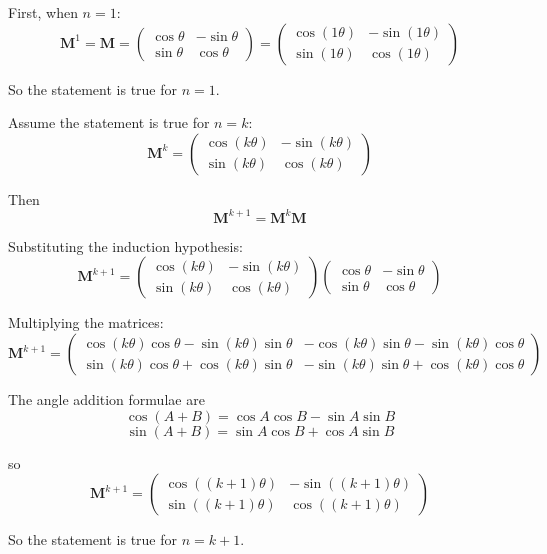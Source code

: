 \documentclass[leqno]{article}
\begin{document}
\begin{enumerate}[
  label=\textbf{\arabic*.},
  leftmargin=*,
  topsep=0pt,
  partopsep=0pt,
  parsep=0pt
]
\begin{djsSolution}
\begin{enumerate}[label=\textbf{(\alph*)}]
  First, when $n=1$:
  \[
  \mathbf{M}^1=\mathbf{M}=
  \begin{pmatrix}
  \cos\theta & -\sin\theta\\
  \sin\theta & \cos\theta
  \end{pmatrix}
  =
  \begin{pmatrix}
  \cos(1\theta) & -\sin(1\theta)\\
  \sin(1\theta) & \cos(1\theta)
  \end{pmatrix}
  \]

  So the statement is true for $n=1$.

  Assume the statement is true for $n=k$:
  \[
  \mathbf{M}^k=
  \begin{pmatrix}
  \cos(k\theta) & -\sin(k\theta)\\
  \sin(k\theta) & \cos(k\theta)
  \end{pmatrix}
  \]

  Then
  \[
  \mathbf{M}^{k+1}=\mathbf{M}^k\mathbf{M}
  \]

  Substituting the induction hypothesis:
  \[
  \mathbf{M}^{k+1}
  =
  \begin{pmatrix}
  \cos(k\theta) & -\sin(k\theta)\\
  \sin(k\theta) & \cos(k\theta)
  \end{pmatrix}
  \begin{pmatrix}
  \cos\theta & -\sin\theta\\
  \sin\theta & \cos\theta
  \end{pmatrix}
  \]

  Multiplying the matrices:
  \[
  \mathbf{M}^{k+1}
  =
  \begin{pmatrix}
  \cos(k\theta)\cos\theta-\sin(k\theta)\sin\theta
  &
  -\cos(k\theta)\sin\theta-\sin(k\theta)\cos\theta
  \\[4pt]
  \sin(k\theta)\cos\theta+\cos(k\theta)\sin\theta
  &
  -\sin(k\theta)\sin\theta+\cos(k\theta)\cos\theta
  \end{pmatrix}
  \]

  The angle addition formulae are
  \[
  \cos(A+B)=\cos A\cos B-\sin A\sin B
  \]
  \[
  \sin(A+B)=\sin A\cos B+\cos A\sin B
  \]

  so
  \[
  \mathbf{M}^{k+1}
  =
  \begin{pmatrix}
  \cos((k+1)\theta) & -\sin((k+1)\theta)\\
  \sin((k+1)\theta) & \cos((k+1)\theta)
  \end{pmatrix}
  \]

  So the statement is true for $n=k+1$.


\end{enumerate}
\end{djsSolution}
\end{enumerate}
\end{document}
